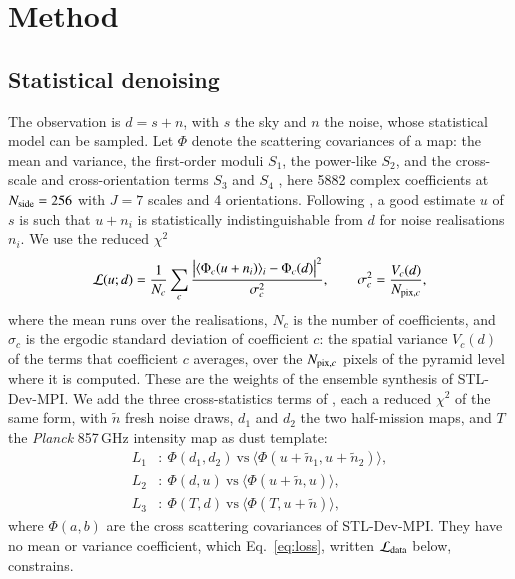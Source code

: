 \documentclass{aa}
\newcommand{\nside}{N_{\rm side}}
\begin{document}
\section{Method}\label{sec:method}

\subsection{Statistical denoising}

The observation is $d=s+n$, with $s$ the sky and $n$ the noise, whose statistical model can be sampled. Let $\Phi$ denote the scattering covariances of a map: the mean and variance, the first-order moduli $S_1$, the power-like $S_2$, and the cross-scale and cross-orientation terms $S_3$ and $S_4$ \citep{cheng2024}, here 5882 complex coefficients at $\nside=256$ with $J=7$ scales and 4 orientations. Following \citet{delouis2022}, a good estimate $u$ of $s$ is such that $u+n_i$ is statistically indistinguishable from $d$ for noise realisations $n_i$. We use the reduced $\chi^2$
\begin{equation}
  \mathcal{L}(u;d)=\frac{1}{N_c}\sum_c \frac{\bigl|\langle\Phi_c(u+n_i)\rangle_i-\Phi_c(d)\bigr|^2}{\sigma_c^2},
  \qquad \sigma_c^2=\frac{V_c(d)}{N_{{\rm pix},c}},
  \label{eq:loss}
\end{equation}
where the mean runs over the realisations, $N_c$ is the number of coefficients, and $\sigma_c$ is the ergodic standard deviation of coefficient $c$: the spatial variance $V_c(d)$ of the terms that coefficient $c$ averages, over the $N_{{\rm pix},c}$ pixels of the pyramid level where it is computed. These are the weights of the ensemble synthesis of STL-Dev-MPI. We add the three cross-statistics terms of \citet{delouis2022}, each a reduced $\chi^2$ of the same form, with $\tilde n$ fresh noise draws, $d_1$ and $d_2$ the two half-mission maps, and $T$ the \textit{Planck} 857\,GHz intensity map as dust template:
\begin{align}
  L_1&:\ \Phi(d_1,d_2)\ \text{vs}\ \langle\Phi(u+\tilde n_1,u+\tilde n_2)\rangle, \\
  L_2&:\ \Phi(d,u)\ \text{vs}\ \langle\Phi(u+\tilde n,u)\rangle, \\
  L_3&:\ \Phi(T,d)\ \text{vs}\ \langle\Phi(T,u+\tilde n)\rangle,
\end{align}
where $\Phi(a,b)$ are the cross scattering covariances of STL-Dev-MPI. They have no mean or variance coefficient, which Eq.~\eqref{eq:loss}, written $\mathcal{L}_{\rm data}$ below, constrains.
\end{document}
